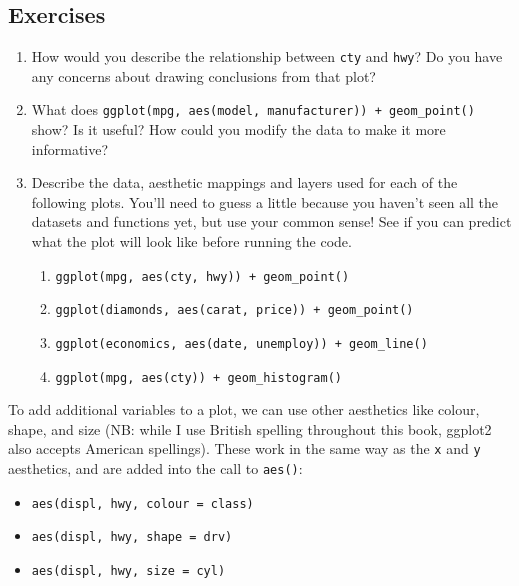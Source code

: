 \subsection{Exercises}

\begin{enumerate}
\def\labelenumi{\arabic{enumi}.}
\item
  How would you describe the relationship between \texttt{cty} and
  \texttt{hwy}? Do you have any concerns about drawing conclusions from
  that plot?
\item
  What does
  \texttt{ggplot(mpg, aes(model, manufacturer)) + geom\_point()} show?
  Is it useful? How could you modify the data to make it more
  informative?
\item
  Describe the data, aesthetic mappings and layers used for each of the
  following plots. You'll need to guess a little because you haven't
  seen all the datasets and functions yet, but use your common sense!
  See if you can predict what the plot will look like before running the
  code.

  \begin{enumerate}
  \def\labelenumii{\arabic{enumii}.}
  \itemsep1pt\parskip0pt
  \item
    \texttt{ggplot(mpg, aes(cty, hwy)) + geom\_point()}
  \item
    \texttt{ggplot(diamonds, aes(carat, price)) + geom\_point()}
  \item
    \texttt{ggplot(economics, aes(date, unemploy)) + geom\_line()}
  \item
    \texttt{ggplot(mpg, aes(cty)) + geom\_histogram()}
  \end{enumerate}
\end{enumerate}


To add additional variables to a plot, we can use other aesthetics like
colour, shape, and size (NB: while I use British spelling throughout
this book, ggplot2 also accepts American spellings). These work in the
same way as the \texttt{x} and \texttt{y} aesthetics, and are added into
the call to \texttt{aes()}:  

\begin{itemize}
\itemsep1pt\parskip0pt
\item
  \texttt{aes(displ, hwy, colour = class)}
\item
  \texttt{aes(displ, hwy, shape = drv)}
\item
  \texttt{aes(displ, hwy, size = cyl)}
\end{itemize}

